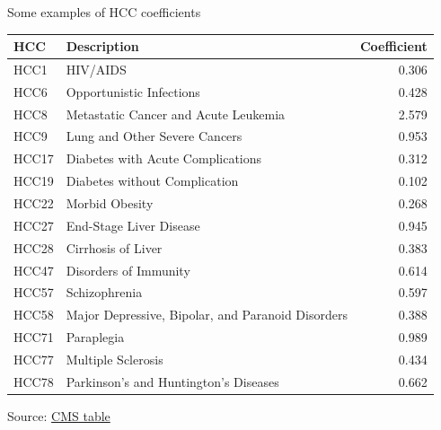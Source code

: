 \begin{frame}{Some examples of HCC coefficients}

    {\scriptsize
\begin{table}[htbp]
\centering
\begin{tabular}{llr}
\toprule
HCC & Description & Coefficient \\
\midrule
HCC1 & HIV/AIDS & 0.306 \\
HCC6 & Opportunistic Infections & 0.428 \\
HCC8 & Metastatic Cancer and Acute Leukemia & 2.579 \\
HCC9 & Lung and Other Severe Cancers & 0.953 \\
HCC17 & Diabetes with Acute Complications & 0.312 \\
HCC19 & Diabetes without Complication & 0.102 \\
HCC22 & Morbid Obesity & 0.268 \\
HCC27 & End-Stage Liver Disease & 0.945 \\
HCC28 & Cirrhosis of Liver & 0.383 \\
HCC47 & Disorders of Immunity & 0.614 \\
HCC57 & Schizophrenia & 0.597 \\
HCC58 & Major Depressive, Bipolar, and Paranoid Disorders & 0.388 \\
HCC71 & Paraplegia & 0.989 \\
HCC77 & Multiple Sclerosis & 0.434 \\
HCC78 & Parkinson's and Huntington's Diseases & 0.662 \\
\bottomrule
\end{tabular}
\end{table}
    }
    Source: \href{https://www.cms.gov/files/document/revised-cms-hcc-model-relative-factor-tablespdf}{CMS table}

\end{frame}
